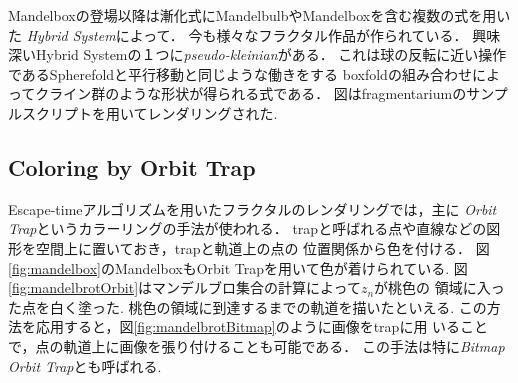 Mandelboxの登場以降は漸化式にMandelbulbやMandelboxを含む複数の式を用いた
{\it Hybrid System}によって．
今も様々なフラクタル作品が作られている．
興味深いHybrid Systemの１つに{\it pseudo-kleinian}がある．
これは球の反転に近い操作であるSpherefoldと平行移動と同じような働きをする
boxfoldの組み合わせによってクライン群のような形状が得られる式である．
図はfragmentariumのサンプルスクリプトを用いてレンダリングされた.

\subsection{Coloring by Orbit Trap}

Escape-timeアルゴリズムを用いたフラクタルのレンダリングでは，主に{\it
Orbit Trap}というカラーリングの手法が使われる．
trapと呼ばれる点や直線などの図形を空間上に置いておき，trapと軌道上の点の
位置関係から色を付ける．
図\ref{fig:mandelbox}のMandelboxもOrbit Trapを用いて色が着けられている.
図\ref{fig:mandelbrotOrbit}はマンデルブロ集合の計算によって$z_n$が桃色の
領域に入った点を白く塗った.
桃色の領域に到達するまでの軌道を描いたといえる.
この方法を応用すると，図\ref{fig:mandelbrotBitmap}のように画像をtrapに用
いることで，点の軌道上に画像を張り付けることも可能である．
この手法は特に{\it Bitmap Orbit Trap}とも呼ばれる.


